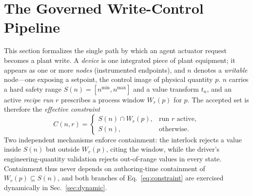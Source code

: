 \section{The Governed Write-Control Pipeline}
This section formalizes the single path by which an agent actuator request becomes a plant write. A \emph{device} is one integrated piece of plant equipment; it appears as one or more \emph{nodes} (instrumented endpoints), and $n$ denotes a \emph{writable} node---one exposing a setpoint, the control image of physical quantity $p$. $n$ carries a hard safety range $S(n) = [n^{\min}, n^{\max}]$ and a value transform $t_n$, and an active \emph{recipe run} $r$ prescribes a process window $W_r(p)$ for $p$. The accepted set is therefore the \emph{effective constraint}
\begin{equation}
C(n, r) =
\begin{cases}
S(n) \cap W_r(p), & \text{run $r$ active},\\[2pt]
S(n), & \text{otherwise.}
\end{cases}
\label{eq:constraint}
\end{equation}
Two independent mechanisms enforce containment: the interlock rejects a value inside $S(n)$ but outside $W_r(p)$, citing the window, while the driver's engineering-quantity validation rejects out-of-range values in every state. Containment thus never depends on authoring-time containment of $W_r(p) \subseteq S(n)$, and both branches of Eq.~\eqref{eq:constraint} are exercised dynamically in Sec.~\ref{sec:dynamic}.

